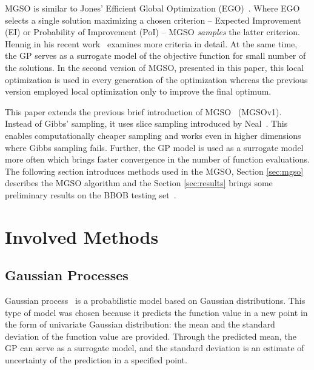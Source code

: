 \documentclass{itatnew}
\begin{document}
MGSO is similar to Jones' Efficient Global Optimization (EGO)~\cite{jones_efficient_1998}.
Where EGO selects a single solution maximizing a chosen criterion -- Expected Improvement (EI) or Probability of Improvement (PoI) -- MGSO \emph{samples} the latter criterion. Hennig in his recent work~\cite{hennig_entropy_2012} examines more criteria in detail. 
At the same time, the GP serves as a surrogate model of the objective function for small number of the solutions. In the second version of MGSO, presented in this paper, this local optimization is used in every generation of the optimization whereas the previous version employed local optimization only to improve the final optimum.

This paper extends the previous brief introduction of MGSO~\cite{bajer_model_2013} (MGSOv1). Instead of Gibbs' sampling, it uses slice sampling introduced by Neal~\cite{neal_slice_2003}. This enables computationally cheaper sampling and works even in higher dimensions where Gibbs sampling fails. Further, the GP model is used as a surrogate model more often which brings faster convergence in the number of function evaluations. The following section introduces methods used in the MGSO, Section \ref{sec:mgso} describes the MGSO algorithm and the Section \ref{sec:results} brings some preliminary results on the BBOB testing set~\cite{hansen_real_2009}.


\section{Involved Methods}

\subsection{Gaussian Processes}

Gaussian process~\cite{rasmussen_gaussian_2006} is a probabilistic model based on Gaussian distributions. This type of model was chosen because it predicts the function value in a new point in the form of univariate Gaussian distribution: the mean and the standard deviation of the function value are provided. Through the predicted mean, the GP can serve as a surrogate model, and the standard deviation is an estimate of uncertainty of the prediction in a specified point.
\end{document}
